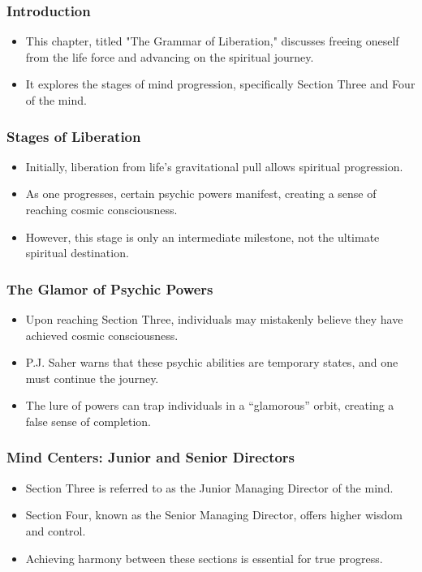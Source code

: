 \begin{frame}[fragile]\frametitle{Introduction}
    \begin{itemize}
        \item This chapter, titled "The Grammar of Liberation," discusses freeing oneself from the life force and advancing on the spiritual journey.
        \item It explores the stages of mind progression, specifically Section Three and Four of the mind.
    \end{itemize}
\end{frame}

\begin{frame}[fragile]\frametitle{Stages of Liberation}
    \begin{itemize}
        \item Initially, liberation from life’s gravitational pull allows spiritual progression.
        \item As one progresses, certain psychic powers manifest, creating a sense of reaching cosmic consciousness.
        \item However, this stage is only an intermediate milestone, not the ultimate spiritual destination.
    \end{itemize}
\end{frame}

\begin{frame}[fragile]\frametitle{The Glamor of Psychic Powers}
    \begin{itemize}
        \item Upon reaching Section Three, individuals may mistakenly believe they have achieved cosmic consciousness.
        \item P.J. Saher warns that these psychic abilities are temporary states, and one must continue the journey.
        \item The lure of powers can trap individuals in a “glamorous” orbit, creating a false sense of completion.
    \end{itemize}
\end{frame}

\begin{frame}[fragile]\frametitle{Mind Centers: Junior and Senior Directors}
    \begin{itemize}
        \item Section Three is referred to as the Junior Managing Director of the mind.
        \item Section Four, known as the Senior Managing Director, offers higher wisdom and control.
        \item Achieving harmony between these sections is essential for true progress.
    \end{itemize}
\end{frame}

